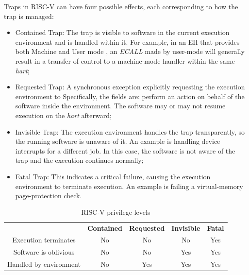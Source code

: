 Traps in RISC-V can have four possible effects, each corresponding to how the trap
is managed:

\begin{itemize}
  \item Contained Trap: The trap is visible to software in the current execution
    environment and is handled within it. For example, in an EII that provides
    both Machine and User mode , an \textit{ECALL} made by user-mode will generally
    result in a transfer of control to a machine-mode handler within the same \textit{hart};

  \item Requested Trap: A synchronous exception explicitly requesting the
    execution environment to Specifically, the fields are: perform an action on
    behalf of the software inside the environment. The software may or may not resume
    execution on the \textit{hart} afterward;

  \item Invisible Trap: The execution environment handles the trap transparently,
    so the running software is unaware of it. An example is handling device
    interrupts for a different job. In this case, the software is not aware of
    the trap and the execution continues normally;

  \item Fatal Trap: This indicates a critical failure, causing the execution environment
    to terminate execution. An example is failing a virtual-memory page-protection
    check.
\end{itemize}

\begin{table}
  \centering
  \begin{tabular}{|c|c|c|c|c|}
    \hline
    \textbf{}                           & \textbf{Contained} & \textbf{Requested} & \textbf{Invisible} & \textbf{Fatal} \\
    \hhline{=====} Execution terminates & No                 & No                 & No                 & Yes            \\
    \hline
    Software is oblivious               & No                 & No                 & Yes                & Yes            \\
    \hline
    Handled by environment              & No                 & Yes                & Yes                & Yes            \\
    \hline
  \end{tabular}
  \caption{RISC-V privilege levels}
  \label{tab:traps}
\end{table}

